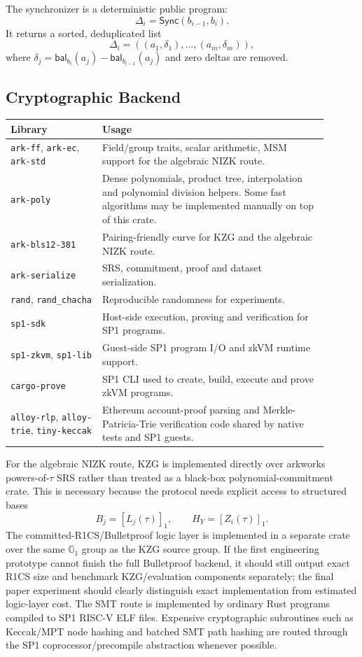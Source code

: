 \documentclass[UTF8,a4paper,11pt]{ctexart}
\newcommand{\G}{\mathbb G}
\newcommand{\Sync}{\mathsf{Sync}}
\newcommand{\bal}{\mathsf{bal}}
\begin{document}
The synchronizer is a deterministic public program:
\[
  \Delta_i=\Sync(b_{i-1},b_i).
\]
It returns a sorted, deduplicated list
\[
  \Delta_i=((a_1,\delta_1),\ldots,(a_m,\delta_m)),
\]
where $\delta_j=\bal_{b_i}(a_j)-\bal_{b_{i-1}}(a_j)$ and zero deltas are removed.

\subsection{Cryptographic Backend}

\begin{longtable}{p{0.26\linewidth}p{0.64\linewidth}}
\toprule
Library & Usage \\
\midrule
\texttt{ark-ff}, \texttt{ark-ec}, \texttt{ark-std} & Field/group traits, scalar arithmetic, MSM support for the algebraic NIZK route. \\
\texttt{ark-poly} & Dense polynomials, product tree, interpolation and polynomial division helpers. Some fast algorithms may be implemented manually on top of this crate. \\
\texttt{ark-bls12-381} & Pairing-friendly curve for KZG and the algebraic NIZK route. \\
\texttt{ark-serialize} & SRS, commitment, proof and dataset serialization. \\
\texttt{rand}, \texttt{rand\_chacha} & Reproducible randomness for experiments. \\
\texttt{sp1-sdk} & Host-side execution, proving and verification for SP1 programs. \\
\texttt{sp1-zkvm}, \texttt{sp1-lib} & Guest-side SP1 program I/O and zkVM runtime support. \\
\texttt{cargo-prove} & SP1 CLI used to create, build, execute and prove zkVM programs. \\
\texttt{alloy-rlp}, \texttt{alloy-trie}, \texttt{tiny-keccak} & Ethereum account-proof parsing and Merkle-Patricia-Trie verification code shared by native tests and SP1 guests. \\
\bottomrule
\end{longtable}

For the algebraic NIZK route, KZG is implemented directly over arkworks powers-of-$\tau$ SRS rather than treated as a black-box polynomial-commitment crate. This is necessary because the protocol needs explicit access to structured bases
\[
  B_j=[L_j(\tau)]_1,\qquad H_Y=[Z_i(\tau)]_1.
\]
The committed-R1CS/Bulletproof logic layer is implemented in a separate crate over the same $\G_1$ group as the KZG source group. If the first engineering prototype cannot finish the full Bulletproof backend, it should still output exact R1CS size and benchmark KZG/evaluation components separately; the final paper experiment should clearly distinguish exact implementation from estimated logic-layer cost. The SMT route is implemented by ordinary Rust programs compiled to SP1 RISC-V ELF files. Expensive cryptographic subroutines such as Keccak/MPT node hashing and batched SMT path hashing are routed through the SP1 coprocessor/precompile abstraction whenever possible.
\end{document}
